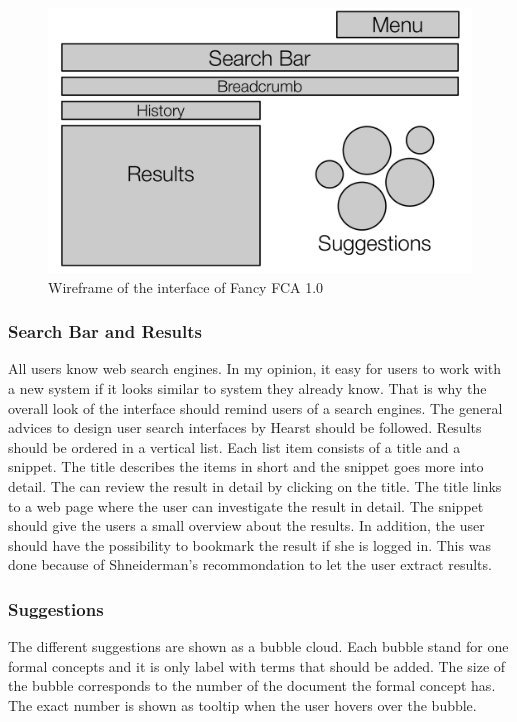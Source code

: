 \documentclass[11pt]{report}
\begin{document}
\begin{figure}[!ht]
	\centering
	\includegraphics[width=\linewidth]{images/schema}
\caption{Wireframe of the interface of Fancy FCA 1.0}
\label{figure:schema}
\end{figure}

\subsubsection{Search Bar and Results}

All users know web search engines. In my opinion, it easy for users to work with a new system if it looks similar to system they already know. That is why the overall look of the interface should remind users of a search engines. The general advices to design user search interfaces by Hearst \cite{Hearst2009} should be followed. Results should be ordered in a vertical list. Each list item consists of a title and a snippet. The title describes the items in short and the snippet goes more into detail. The can review the result in detail by clicking on the title. The title links to a web page where the user can investigate the result in detail. The snippet should give the users a small overview about the results. In addition, the user should have the possibility to bookmark the result if she is logged in. This was done because of Shneiderman's recommondation to let the user extract results.

\subsubsection{Suggestions}

The different suggestions are shown as a bubble cloud. Each bubble stand for one formal concepts and it is only label with terms that should be added. The size of the bubble corresponds to the number of the document the formal concept has. The exact number is shown as tooltip when the user hovers over the bubble.
\end{document}
